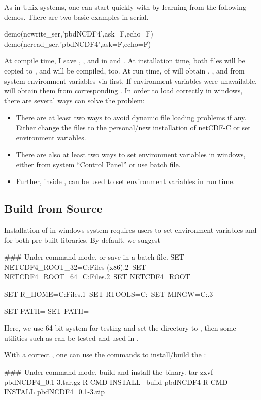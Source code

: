 As in Unix systems,
one can start quickly with  by learning from the
following demos. There are two basic examples in serial.
\begin{Command}
demo(ncwrite_ser,'pbdNCDF4',ask=F,echo=F)
demo(ncread_ser,'pbdNCDF4',ask=F,echo=F)
\end{Command}

At compile time, I save
, , and 
in  and .
At installation time, both files will be copied to
,
and  will be compiled, too.
At run time,  of  will
obtain , , and 
from system environment variables via  first.
If environment variables were unavailable,  will
obtain them from corresponding .
In order to load  correctly in windows, there are several
ways can solve the problem:
\begin{itemize}
\item
There are at least two ways to avoid dynamic file loading problems
if any. Either change the  files to the personal/new
installation of netCDF-C or set environment variables.
\item
There are also at least two ways to set environment variables in windows,
either from system ``Control Panel'' or use batch file.
\item
Further, inside ,  can be used to
set environment variables in run time.
\end{itemize}



\subsection[Build from Source]{Build from Source}
\label{sec:building_from_source}

Installation of  in windows system requires users to set
environment variables  and
 for both pre-built libraries.
By default, we suggest
\begin{Command}
### Under command mode, or save in a batch file.
SET NETCDF4_ROOT_32=C:\Program Files (x86).2\
SET NETCDF4_ROOT_64=C:\Program Files.2\
SET NETCDF4_ROOT=%

SET R_HOME=C:\Program Files\R{}.1\
SET RTOOLS=C:\Rtools\bin\
SET MINGW=C:\Rtools{}.3\bin\

SET PATH=%
SET PATH=%
\end{Command}
Here, we use 64-bit system for testing and set the  directory
to \code{PATH}, then
some utilities such as  can be tested and used in
.

With a correct , one can use the  commands
to install/build the \pkg{pbdNCDF4}:
\begin{Command}
### Under command mode, build and install the binary.
tar zxvf pbdNCDF4_0.1-3.tar.gz
R CMD INSTALL --build pbdNCDF4
R CMD INSTALL pbdNCDF4_0.1-3.zip
\end{Command}

